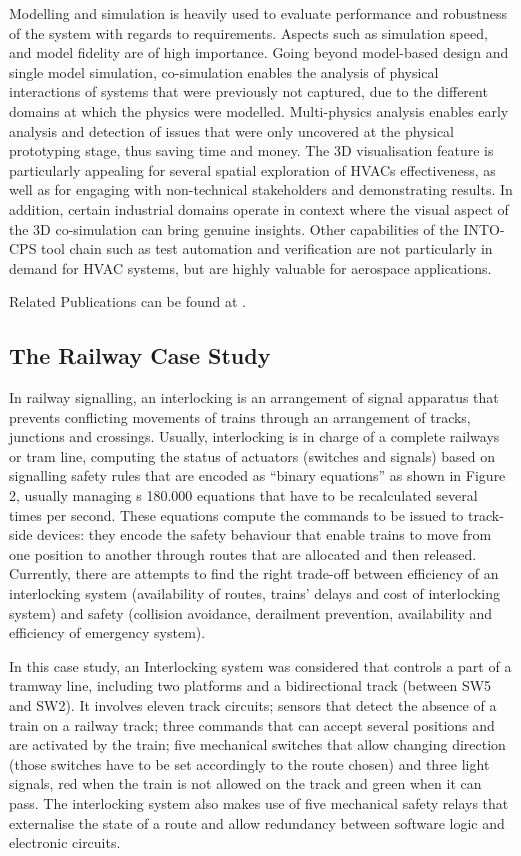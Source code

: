 Modelling and simulation is heavily used to evaluate performance and robustness of the system with regards to requirements. Aspects such as simulation speed, and model fidelity are of high importance. Going beyond model-based design and single model simulation, co-simulation enables the analysis of physical interactions of systems that were previously not captured, due to the different domains at which the physics were modelled. Multi-physics analysis enables early analysis and detection of issues that were only uncovered at the physical prototyping stage, thus saving time and money. The 3D visualisation feature is particularly appealing for several spatial exploration of HVACs effectiveness, as well as for engaging with non-technical stakeholders and demonstrating results. In addition, certain industrial domains operate in context where the visual aspect of the 3D co-simulation can bring genuine insights. Other capabilities of the INTO-CPS tool chain such as test automation and verification are not particularly in demand for HVAC systems, but are highly valuable for aerospace applications.

Related Publications can be found at \cite{Fitzgerald&16,Couto&17}.

\subsection{The Railway Case Study} 

In railway signalling, an interlocking is an arrangement of signal apparatus that prevents conflicting movements of trains through an arrangement of tracks, junctions and crossings. Usually, interlocking is in charge of a complete railways or tram line, computing the status of actuators (switches and signals) based on signalling safety rules that are encoded as ``binary equations'' as shown in Figure 2, usually managing s 180.000 equations that have to be recalculated several times per second. These equations compute the commands to be issued to track-side devices: they encode the safety behaviour that enable trains to move from one position to another through routes that are allocated and then released. Currently, there are attempts to find the right trade-off between efficiency of an interlocking system (availability of routes, trains' delays and cost of interlocking system) and safety (collision avoidance, derailment prevention, availability and efficiency of emergency system).

In this case study, an Interlocking system was considered that controls a part of a tramway line, including two platforms and a bidirectional track (between SW5 and SW2). It involves eleven track circuits; sensors that detect the absence of a train on a railway track; three commands that can accept several positions and are activated by the train; five mechanical switches that allow changing direction (those switches have to be set accordingly to the route chosen) and three light signals, red when the train is not allowed on the track and green when it can pass. The interlocking system also makes use of five mechanical safety relays that externalise the state of a route and allow redundancy between software logic and electronic circuits.

